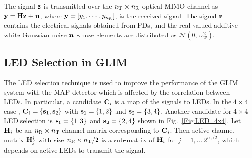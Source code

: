 \documentclass[12pt,letterpaper]{IEEEtran}
\begin{document}
The signal $\bold z$ is transmitted over the $n_{\text T} \times n_{\text R}$ optical MIMO channel as $\bold{y}=\bold{H} \bold z +\bold n$, where $\bold{y}= [ y_{1}, \cdots,y_{n_{\text R}}]$, is the received signal. The signal $\bold z$ contains the electrical signals obtained from PDs, and the real-valued additive white Gaussian noise  $\bold n$ whose elements are distributed as $\mathcal{N}(0,\,\sigma_w^{2})$.
\subsection{LED Selection in GLIM}
The LED selection technique is used to improve the performance of the GLIM system with the MAP detector which is affected by the correlation between LEDs. In particular, a candidate ${{\bf{C}}_i}$ is a map of the signals to LEDs. In the $4 \times 4$ case \cite{yesilkaya_optical_2017}, ${{\bf{C}}_i} = \left\{ {{{\bf{s}}_1},{{\bf{s}}_2}} \right\}$ with ${\bold s}_1 =\{1, 2\}$ and ${\bold s}_2 =\{3, 4\}$. Another candidate for $4 \times 4$ LED selection is ${\bold s}_1 =\{1, 3\}$ and ${\bold s}_2 =\{2, 4\}$ shown in Fig.~\ref{Fig:LED_4x4}. Let ${{\bf{H}}_i}$ be an $n_{\text R} \times n_{\text T}$ channel matrix corresponding to ${{\bf{C}}_i}$. Then active channel matrix ${\bf{H}}_j^i$ with size $n_{\text R} \times n_{\text T}/2$ is a sub-matrix of ${{\bf{H}}_i}$ for $j = 1,...\,{2^{{n_{\text{T}}}/2}}$, which depends on active LEDs to transmit the signal.
\end{document}
